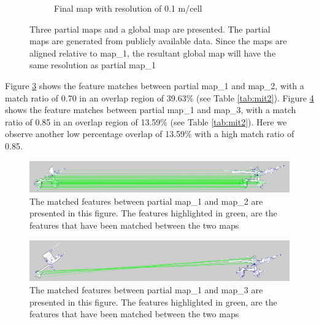 \begin{figure}[H]
\begin{subfigure}{0.5\textwidth}
\caption{Final map with resolution of 0.1 m/cell}
\label{fig:mit24}
\end{subfigure}
\caption{Three partial maps and a global map are presented. The partial  maps are generated from publicly available data. Since the maps are aligned relative to map\_1, the resultant global map will have the same resolution as partial map\_1}
\label{fig:mit2}
\end{figure}


Figure \ref{fig:mit2matches1} shows the feature matches between partial map\_1 and map\_2, with a match ratio of 0.70 in an overlap region of 39.63\% (see Table \ref{tab:mit2}). Figure \ref{fig:mit2matches2} shows the feature matches between partial map\_1 and map\_3, with a match ratio of 0.85 in an overlap region of 13.59\% (see Table \ref{tab:mit2}). Here we observe another low percentage overlap of 13.59\% with a high match ratio of 0.85.


\begin{figure}[H]
    \centering
    \includegraphics[width=1\textwidth]{figs/mit_results/b/matchesPartialMap1Map2.jpg}
    \caption{The matched features between partial map\_1 and map\_2 are presented in this figure. The features highlighted in green, are the features that have been matched between the two maps}
    \label{fig:mit2matches1}
\end{figure} 

\begin{figure}[H]
    \centering
    \includegraphics[width=1\textwidth]{figs/mit_results/b/matchesPartialMap1Map3.jpg}
    \caption{The matched features between partial map\_1 and map\_3 are presented in this figure. The features highlighted in green, are the features that have been matched between the two maps}
    \label{fig:mit2matches2}
\end{figure} 

